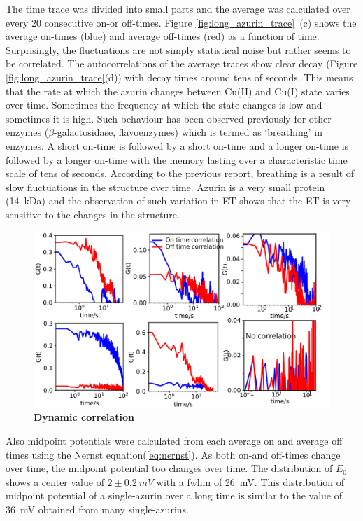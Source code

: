 \documentclass[journal=jacsat,manuscript=article]{achemso}
\begin{document}
The time trace was divided into small parts and the average was calculated over every $20$ consecutive on-or off-times. 
Figure \ref{fig:long_azurin_trace}~(c) shows the average on-times (blue) and average off-times (red) as a function of time.
Surprisingly, the fluctuations are not simply statistical noise but rather seems to be correlated. 
The autocorrelations of the average traces show clear decay (Figure \ref{fig:long_azurin_trace}(d)) with decay times around tens of seconds.
This means that the rate at which the azurin changes between Cu(II) and Cu(I) state varies over time.
Sometimes the frequency at which the state changes is low and sometimes it is high.
Such behaviour has been observed previously for other enzymes ($\beta$-galactosidase, flavoenzymes)\cite{lu1998single-molecule,kou2005single-molecule,english2006ever-fluctuating} which is termed as `breathing' in enzymes.
A short on-time is followed by a short on-time and a longer on-time is followed by a longer on-time with the memory lasting over a characteristic time scale of tens of seconds.
According to the previous report, breathing is a result of slow fluctuations in the structure over time.
Azurin is a very small protein (\SI{14}{kDa}) and the observation of such variation in ET shows that the ET is very sensitive to the changes in the structure.\\
\begin{figure}
	\centering
	\includegraphics[width=\textwidth]{Dynamic_corr}
	\caption{\textbf{Dynamic correlation}}
	\label{fig:Dynamic_corr}
\end{figure}
Also midpoint potentials were calculated from each average on and average off times using the Nernst equation(\ref{eq:nernst}).
As both on-and off-times change over time, the midpoint potential too changes over time. 
The distribution of $E_0$ shows a center value of $2\pm0.2~mV$ with a fwhm of \SI{26}{\mV}.
This distribution of midpoint potential of a single-azurin over a long time is similar to the value of \SI{36}{\mV} obtained from many single-azurins.
\end{document}
